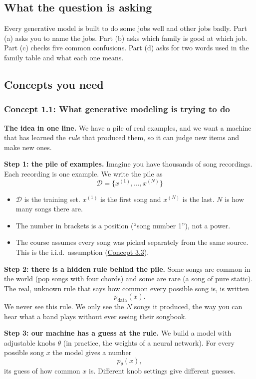 \documentclass[12pt,a4paper]{article}
\begin{document}
\subsection{What the question is asking}

Every generative model is built to do some jobs well and other jobs badly. Part (a) asks you to name the jobs. Part (b) asks which family is good at which job. Part (c) checks five common confusions. Part (d) asks for two words used in the family table and what each one means.

\subsection{Concepts you need}

\subsubsection{Concept 1.1: What generative modeling is trying to do}\label{c1-1}

\textbf{The idea in one line.} We have a pile of real examples, and we want a machine that has learned the \emph{rule} that produced them, so it can judge new items and make new ones.

\textbf{Step 1: the pile of examples.} Imagine you have thousands of song recordings. Each recording is one example. We write the pile as
\[
\mathcal{D}=\{x^{(1)},\dots,x^{(N)}\}
\]
\begin{itemize}[nosep]
  \item $\mathcal{D}$ is the training set. $x^{(1)}$ is the first song and $x^{(N)}$ is the last. $N$ is how many songs there are.
  \item The number in brackets is a position (``song number 1''), not a power.
  \item The course assumes every song was picked separately from the same source. This is the i.i.d.\ assumption (\hyperref[c3-3]{Concept 3.3}).
\end{itemize}

\textbf{Step 2: there is a hidden rule behind the pile.} Some songs are common in the world (pop songs with four chords) and some are rare (a song of pure static). The real, unknown rule that says how common every possible song is, is written
\[
p_{\text{data}}(x).
\]
We never see this rule. We only see the $N$ songs it produced, the way you can hear what a band plays without ever seeing their songbook.

\textbf{Step 3: our machine has a guess at the rule.} We build a model with adjustable knobs $\theta$ (in practice, the weights of a neural network). For every possible song $x$ the model gives a number
\[
p_\theta(x),
\]
its guess of how common $x$ is. Different knob settings give different guesses.
\end{document}
